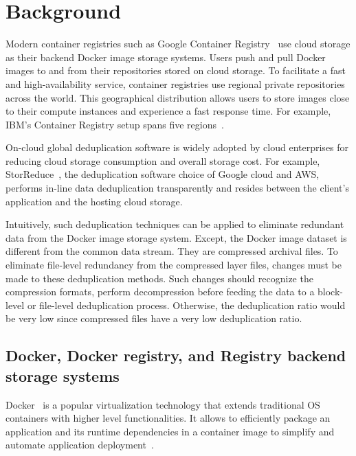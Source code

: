 \section{Background}
\label{sec:background}

Modern container registries such as Google Container Registry~\cite{GoogleContainerRegistry} use cloud storage as their backend Docker image storage systems. 
Users push and pull Docker images to and from their repositories stored on cloud storage. 
To facilitate a fast and high-availability service, container registries use regional private repositories across the world.  
This geographical distribution allows users to store images close to their compute instances and experience a fast response time. 
For example, IBM's Container Registry setup spans five regions~\cite{dockerworkload}. 

On-cloud global deduplication software is widely adopted by cloud enterprises for reducing cloud storage consumption and overall storage cost. 
For example, StorReduce~\cite{storreduce_purestorage}, the deduplication software choice of Google cloud and AWS, 
performs in-line data deduplication transparently and resides between the client's application and the hosting cloud storage.

Intuitively, such deduplication techniques can be applied to eliminate redundant data from the Docker image storage system.  
Except, the Docker image dataset is different from the common data stream. 
They are compressed archival files.
To eliminate file-level redundancy from the compressed layer files, changes must be made to these deduplication methods. 
Such changes should recognize the compression formats, perform decompression before feeding the data to a block-level or file-level deduplication process. 
Otherwise, the deduplication ratio would be very low since compressed files have a very low deduplication ratio. 

\subsection{Docker, Docker registry, and Registry backend storage systems}
Docker~\cite{docker} is a popular virtualization technology that extends traditional OS containers with higher level functionalities.
It allows to efficiently package an application and its runtime dependencies in a container image to simplify and automate application deployment~\cite{slacker}.

